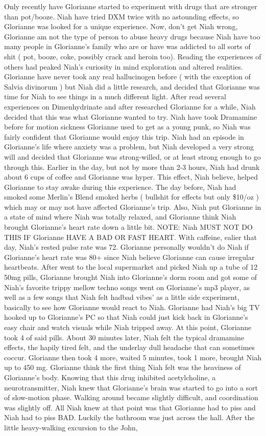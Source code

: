 \documentclass[12pt]{book}
\begin{document}
Only recently have Glorianne started to experiment with drugs that are stronger than pot/booze. Niah have tried DXM twice with no astounding effects, so Glorianne was looked for a unique experience. Now, don't get Niah wrong, Glorianne am not the type of person to abuse heavy drugs because Niah have too many people in Glorianne's family who are or have was addicted to all sorts of shit ( pot, booze, coke, possibly crack and heroin too). Reading the experiences of others had peaked Niah's curiosity in mind exploration and altered realities. Glorianne have never took any real hallucinogen before ( with the exception of Salvia divinorum ) but Niah did a little research, and decided that Glorianne was time for Niah to see things in a much different light. After read several experiences on Dimenhydrinate and after researched Glorianne for a while, Niah decided that this was what Glorianne wanted to try. Niah have took Dramamine before for motion sickness Glorianne used to get as a young punk, so Niah was fairly confident that Glorianne would enjoy this trip. Niah had an episode in Glorianne's life where anxiety was a problem, but Niah developed a very strong will and decided that Glorianne was strong-willed, or at least strong enough to go through this. Earlier in the day, but not by more than 2-3 hours, Niah had drunk about 6 cups of coffee and Glorianne was hyper. This effect, Niah believe, helped Glorianne to stay awake during this experience. The day before, Niah had smoked some Merlin's Blend smoked herbs ( bullshit for effects but only \$10/oz ) which may or may not have affected Glorianne's trip. Also, Niah put Glorianne in a state of mind where Niah was totally relaxed, and Glorianne think Niah brought Glorianne's heart rate down a little bit. NOTE: Niah MUST NOT DO THIS IF Glorianne HAVE A BAD OR FAST HEART. With caffeine, ealier that day, Niah's rested pulse rate was 72. Glorianne personally wouldn't do Niah if Glorianne's heart rate was 80+ since Niah believe Glorianne can cause irregular heartbeats. After went to the local supermarket and picked Niah up a tube of 12 50mg pills, Glorianne brought Niah into Glorianne's dorm room and got some of Niah's favorite trippy mellow techno songs went on Glorianne's mp3 player, as well as a few songs that Niah felt hadbad vibes' as a little side experiment, basically to see how Glorianne would react to Niah. Glorianne had Niah's big TV hooked up to Glorianne's PC so that Niah could just kick back in Glorianne's easy chair and watch visuals while Niah tripped away. At this point, Glorianne took 4 of said pills. About 30 minutes later, Niah felt the typical dramamine effects, the hapily tired felt, and the underlay dull headache that can sometimes coccur. Glorianne then took 4 more, waited 5 minutes, took 1 more, brought Niah up to 450 mg. Glorianne think the first thing Niah felt was the heaviness of Glorianne's body. Knowing that this drug inhibited acetylcholine, a neurotransmitter, Niah knew that Glorianne's brain was started to go into a sort of slow-motion phase. Walking around became slightly difficult, and coordination was slightly off. All Niah knew at that point was that Glorianne had to piss and Niah had to piss BAD. Luckily the bathroom was just across the hall. After the little heavy-walking excursion to the John, 
\end{document}
